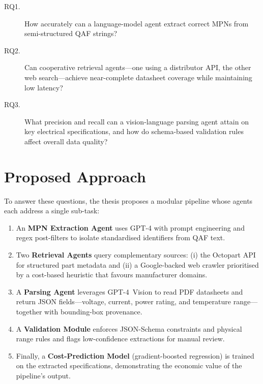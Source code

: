 \begin{description}
  \item[RQ1.] How accurately can a language-model agent extract correct MPNs from semi-structured QAF strings?
  \item[RQ2.] Can cooperative retrieval agents—one using a distributor API, the other web search—achieve near-complete datasheet coverage while maintaining low latency?
  \item[RQ3.] What precision and recall can a vision-language parsing agent attain on key electrical specifications, and how do schema-based validation rules affect overall data quality?
\end{description}

\section{Proposed Approach}
To answer these questions, the thesis proposes a modular pipeline whose agents each address a single sub-task:  
\begin{enumerate}
  \item An \textbf{MPN Extraction Agent} uses GPT-4 with prompt engineering and regex post-filters to isolate standardised identifiers from QAF text.  
  \item Two \textbf{Retrieval Agents} query complementary sources: (i) the Octopart API for structured part metadata and (ii) a Google-backed web crawler prioritised by a cost-based heuristic that favours manufacturer domains.  
  \item A \textbf{Parsing Agent} leverages GPT-4~Vision to read PDF datasheets and return JSON fields—voltage, current, power rating, and temperature range—together with bounding-box provenance.  
  \item A \textbf{Validation Module} enforces JSON-Schema constraints and physical range rules and flags low-confidence extractions for manual review.  
  \item Finally, a \textbf{Cost-Prediction Model} (gradient-boosted regression) is trained on the extracted specifications, demonstrating the economic value of the pipeline’s output.
\end{enumerate}

